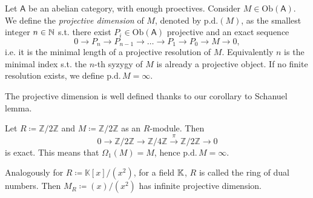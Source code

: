 \begin{defn}
	Let $\mathsf{A}$ be an abelian category, with enough proectives.
	Consider $M \in \mathrm{Ob} \left(\mathsf{A}\right)$.
	We define the {\em projective dimension} of $M$, denoted by $\mathrm{p.d.}(M)$, 
	as the smallest integer $n \in \mathbb{N}$ s.t. there exist $P_i \in \mathrm{Ob} \left(\mathsf{A}\right)$
	projective and an exact sequence
	\begin{equation}
	0 \to P_n \to P_{n-1} \to \ldots \to P_1 \to P_0 \to M \to 0
	,\end{equation} 
	i.e. it is the minimal length of a projective resolution of $M$.
	Equivalently $n$ is the minimal index s.t. the $n$-th syzygy of $M$ is
	already a projective object.
	If no finite resolution exists, we define $\mathrm{p.d.}\, M = \infty$.
\end{defn}

\begin{rem}[]
	The projective dimension is well defined thanks to our corollary to Schanuel lemma.
\end{rem}

\begin{ex}
	Let $R \coloneqq \mathbb{Z}/2\mathbb{Z}$ and $M \coloneqq \mathbb{Z}/2\mathbb{Z}$ as an $R$-module.
	Then
	\begin{equation}
	0 \to \mathbb{Z}/2\mathbb{Z} \to \mathbb{Z}/4\mathbb{Z} \xrightarrow{\pi} \mathbb{Z}/2\mathbb{Z} \to 0
	\end{equation} 
	is exact.
	This means that $\Omega_1(M) = M$, hence $\mathrm{p.d.}\, M = \infty$.

	Analogously for $R \coloneqq \mathbb{K}[x]/ \left( x^2 \right)$, for a field $\mathbb{K}$,
	$R$ is called the ring of dual numbers.
	Then $M_R \coloneqq (x) / (x^2)$ has infinite projective dimension.
\end{ex} 

